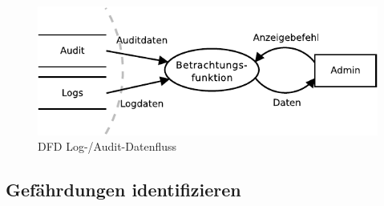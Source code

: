 \documentclass[11pt,a4paper]{report}
\begin{document}
\begin{figure}[htbp]
\centering
\includegraphics[scale=1.2]{images/dfd_logs.pdf}
\caption{DFD Log-/Audit-Datenfluss}
\label{fig:dfd_logs}
\end{figure}

\subsection{Gefährdungen identifizieren}
\end{document}
